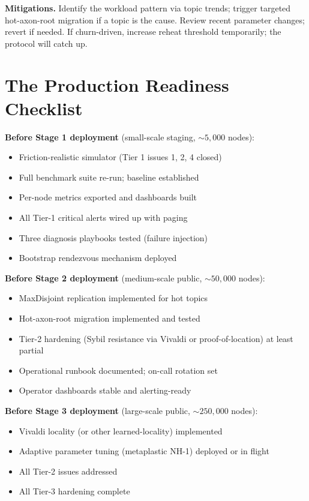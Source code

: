 \documentclass[twoside,nobib]{tufte-book}
\begin{document}
\textbf{Mitigations.} Identify the workload pattern via topic
trends; trigger targeted hot-axon-root migration if a topic is
the cause. Review recent parameter changes; revert if needed. If
churn-driven, increase reheat threshold temporarily; the
protocol will catch up.

\section{The Production Readiness Checklist}

\textbf{Before Stage 1 deployment} (small-scale staging,
$\sim 5{,}000$ nodes):

\begin{itemize}\setlength\itemsep{0.05em}
  \item Friction-realistic simulator (Tier 1 issues 1, 2, 4 closed)
  \item Full benchmark suite re-run; baseline established
  \item Per-node metrics exported and dashboards built
  \item All Tier-1 critical alerts wired up with paging
  \item Three diagnosis playbooks tested (failure injection)
  \item Bootstrap rendezvous mechanism deployed
\end{itemize}

\textbf{Before Stage 2 deployment} (medium-scale public,
$\sim 50{,}000$ nodes):

\begin{itemize}\setlength\itemsep{0.05em}
  \item MaxDisjoint replication implemented for hot topics
  \item Hot-axon-root migration implemented and tested
  \item Tier-2 hardening (Sybil resistance via Vivaldi or
    proof-of-location) at least partial
  \item Operational runbook documented; on-call rotation set
  \item Operator dashboards stable and alerting-ready
\end{itemize}

\textbf{Before Stage 3 deployment} (large-scale public,
$\sim 250{,}000$ nodes):

\begin{itemize}\setlength\itemsep{0.05em}
  \item Vivaldi locality (or other learned-locality)
    implemented
  \item Adaptive parameter tuning (metaplastic NH-1) deployed
    or in flight
  \item All Tier-2 issues addressed
  \item All Tier-3 hardening complete
\end{itemize}
\end{document}
